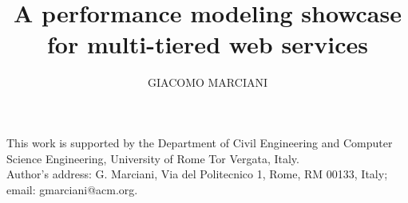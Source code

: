 \documentclass[prodmode,acmutv-cw-pmcsn]{acmlarge}
\title{A performance modeling showcase for multi-tiered web services}
\author{GIACOMO MARCIANI \affil{University of Rome Tor Vergata}}
\numberwithin{equation}{section}
\begin{document}
\begin{bottomstuff}
This work is supported by the Department of Civil Engineering and Computer Science
Engineering, University of Rome Tor Vergata, Italy.\\
Author's address: G. Marciani, Via del Politecnico 1, Rome, RM 00133, Italy;
email: gmarciani@acm.org.
\end{bottomstuff}

\maketitle


















\elecappendix




\end{document}
